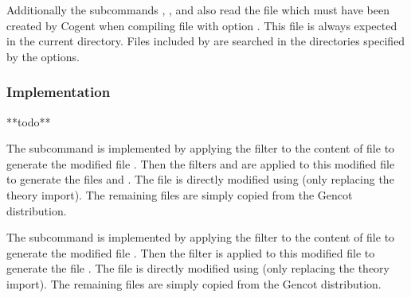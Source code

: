 Additionally the subcommands , , and  also read 
the file  which must have been created by Cogent when compiling file  with 
option . This file is always expected in the current directory. Files included by  
are searched in the directories specified by the  options.

\subsubsection{Implementation}

**todo**

The subcommand  is implemented by applying the filter  to 
the content of file  to generate the modified file .
Then the filters  and  are applied to this modified file to generate
the files  and . 
The file  is directly modified using
 (only replacing the theory import). The remaining files are simply copied from the Gencot distribution.

The subcommand  is implemented by applying the filter  to 
the content of file  to generate the modified file . Then
the filter  is applied to this modified file to generate
the file . The file  is directly modified using
 (only replacing the theory import). The remaining files are simply copied from the Gencot distribution.

